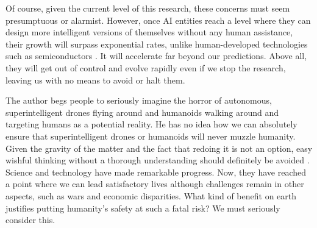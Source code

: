 Of course, given the current level of this research, these concerns must seem presumptuous or alarmist.
However, once AI entities reach a level where they can design more intelligent versions of themselves
without any human assistance, their growth will surpass exponential rates,
unlike human-developed technologies such as semiconductors \citep{Kurzweil}.
It will accelerate far beyond our predictions.
Above all, they will get out of control and evolve rapidly even if we stop the research,
leaving us with no means to avoid or halt them.

The author begs people to seriously imagine the horror of autonomous, superintelligent drones flying around
and humanoids walking around and targeting humans as a potential reality. 
He has no idea how we can absolutely ensure
that superintelligent drones or humanoids will never muzzle humanity.
Given the gravity of the matter and the fact that redoing it is not an option, 
easy wishful thinking without a thorough understanding should definitely be avoided \citep{Yudkowsky}.
Science and technology have made remarkable progress.
Now, they have reached a point where we can lead satisfactory lives
although challenges remain in other aspects, such as wars and economic disparities.
What kind of benefit on earth justifies putting humanity's safety at such a fatal risk?
We must seriously consider this.

